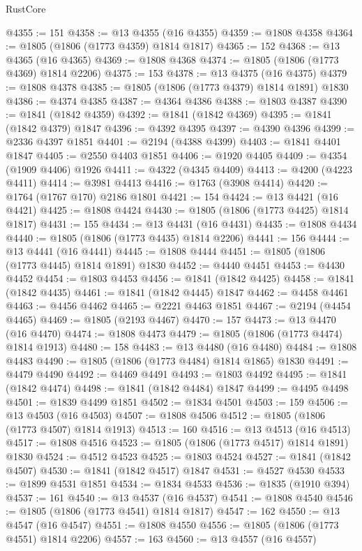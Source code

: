 \begin{lexlean}{RustCore}
\begin{coremodule}
@4355 := 151
@4358 := @13 @4355 (@16 @4355)
@4359 := @1808 @4358
@4364 := @1805 (@1806 (@1773 @4359) @1814 @1817)
@4365 := 152
@4368 := @13 @4365 (@16 @4365)
@4369 := @1808 @4368
@4374 := @1805 (@1806 (@1773 @4369) @1814 @2206)
@4375 := 153
@4378 := @13 @4375 (@16 @4375)
@4379 := @1808 @4378
@4385 := @1805 (@1806 (@1773 @4379) @1814 @1891) @1830
@4386 := @4374 @4385
@4387 := @4364 @4386
@4388 := @1803 @4387
@4390 := @1841 (@1842 @4359)
@4392 := @1841 (@1842 @4369)
@4395 := @1841 (@1842 @4379) @1847
@4396 := @4392 @4395
@4397 := @4390 @4396
@4399 := @2336 @4397 @1851
@4401 := @2194 (@4388 @4399)
@4403 := @1841 @4401 @1847
@4405 := @2550 @4403 @1851
@4406 := @1920 @4405
@4409 := @4354 (@1909 @4406) @1926
@4411 := @4322 (@4345 @4409)
@4413 := @4200 (@4223 @4411)
@4414 := @3981 @4413
@4416 := @1763 (@3908 @4414)
@4420 := @1764 (@1767 @170) @2186 @1801
@4421 := 154
@4424 := @13 @4421 (@16 @4421)
@4425 := @1808 @4424
@4430 := @1805 (@1806 (@1773 @4425) @1814 @1817)
@4431 := 155
@4434 := @13 @4431 (@16 @4431)
@4435 := @1808 @4434
@4440 := @1805 (@1806 (@1773 @4435) @1814 @2206)
@4441 := 156
@4444 := @13 @4441 (@16 @4441)
@4445 := @1808 @4444
@4451 := @1805 (@1806 (@1773 @4445) @1814 @1891) @1830
@4452 := @4440 @4451
@4453 := @4430 @4452
@4454 := @1803 @4453
@4456 := @1841 (@1842 @4425)
@4458 := @1841 (@1842 @4435)
@4461 := @1841 (@1842 @4445) @1847
@4462 := @4458 @4461
@4463 := @4456 @4462
@4465 := @2221 @4463 @1851
@4467 := @2194 (@4454 @4465)
@4469 := @1805 (@2193 @4467)
@4470 := 157
@4473 := @13 @4470 (@16 @4470)
@4474 := @1808 @4473
@4479 := @1805 (@1806 (@1773 @4474) @1814 @1913)
@4480 := 158
@4483 := @13 @4480 (@16 @4480)
@4484 := @1808 @4483
@4490 := @1805 (@1806 (@1773 @4484) @1814 @1865) @1830
@4491 := @4479 @4490
@4492 := @4469 @4491
@4493 := @1803 @4492
@4495 := @1841 (@1842 @4474)
@4498 := @1841 (@1842 @4484) @1847
@4499 := @4495 @4498
@4501 := @1839 @4499 @1851
@4502 := @1834 @4501
@4503 := 159
@4506 := @13 @4503 (@16 @4503)
@4507 := @1808 @4506
@4512 := @1805 (@1806 (@1773 @4507) @1814 @1913)
@4513 := 160
@4516 := @13 @4513 (@16 @4513)
@4517 := @1808 @4516
@4523 := @1805 (@1806 (@1773 @4517) @1814 @1891) @1830
@4524 := @4512 @4523
@4525 := @1803 @4524
@4527 := @1841 (@1842 @4507)
@4530 := @1841 (@1842 @4517) @1847
@4531 := @4527 @4530
@4533 := @1899 @4531 @1851
@4534 := @1834 @4533
@4536 := @1835 (@1910 @394)
@4537 := 161
@4540 := @13 @4537 (@16 @4537)
@4541 := @1808 @4540
@4546 := @1805 (@1806 (@1773 @4541) @1814 @1817)
@4547 := 162
@4550 := @13 @4547 (@16 @4547)
@4551 := @1808 @4550
@4556 := @1805 (@1806 (@1773 @4551) @1814 @2206)
@4557 := 163
@4560 := @13 @4557 (@16 @4557)

\end{coremodule}
\end{lexlean}
